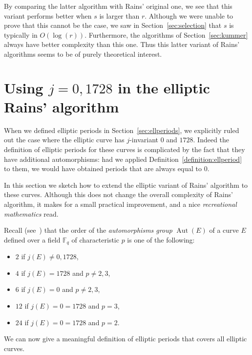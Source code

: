 \documentclass[12pt]{article}
\theoremstyle{plain}
\theoremstyle{definition}
\DeclareMathOperator{\Aut}{Aut}
\def\F{\ensuremath{\mathbb{F}}}
\newcounter{algorithm}
\begin{document}
By comparing the latter algorithm with Rains' original one, we see
that this variant performs better when $s$ is larger than $r$. %
Although we were unable to prove that this cannot be the case, we saw
in Section~\ref{sec:selection} that $s$ is typically in
$O(\log(r))$. %
Furthermore, the algorithms of Section~\ref{sec:kummer} always have
better complexity than this one. %
Thus this latter variant of Rains' algorithms seems to be of purely
theoretical interest.



\section{Using $j=0,1728$ in the elliptic Rains' algorithm}
\label{app:elliptic-curves}

When we defined elliptic periods in Section~\ref{sec:ellperiods}, we
explicitly ruled out the case where the elliptic curve has
$j$-invariant $0$ and $1728$. %
Indeed the definition of elliptic periods for these curves is
complicated by the fact that they have additional automorphisms: had
we applied Definition~\ref{definition:ellperiod} to them, we would
have obtained periods that are always equal to $0$.

In this section we sketch how to extend the elliptic variant of Rains'
algorithm to these curves. %
Although this does not change the overall complexity of Rains'
algorithm, it makes for a small practical improvement, and a nice
\emph{recreational mathematics} read.

Recall (see~\cite[III.10]{Sil}) that the order of the
\emph{automorphisms group} $\Aut(E)$ of a curve $E$ defined over a
field $\F_q$ of characteristic $p$ is one of the following:
\begin{itemize}
\item $2$ if $j(E)\ne0,1728$,
\item $4$ if $j(E) = 1728$ and $p\ne2,3$,
\item $6$ if $j(E) = 0$ and $p\ne2,3$,
\item $12$ if $j(E) = 0 = 1728$ and $p=3$,
\item $24$ if $j(E) = 0 = 1728$ and $p=2$.
\end{itemize}
We can now give a meaningful definition of elliptic periods that
covers all elliptic curves.
\end{document}
